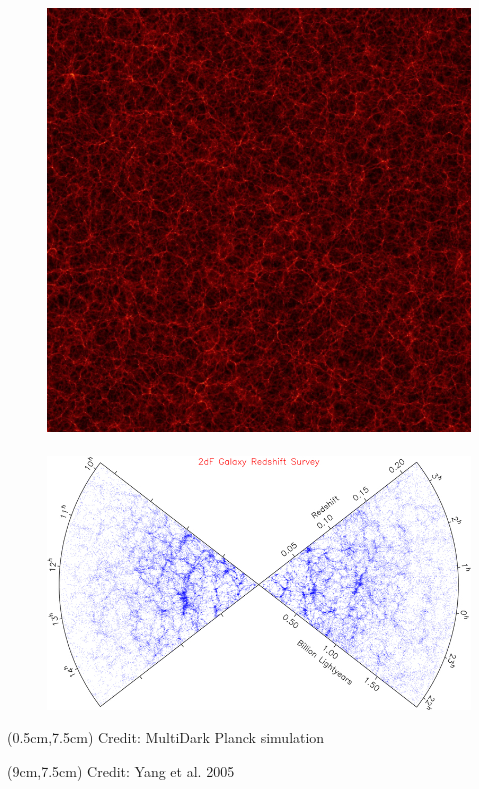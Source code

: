 \documentclass[aspectratio=169]{beamer}
\begin{document}
\begin{frame}[plain,t]
  \begin{figure}
    \includegraphics[height=0.65\textheight]{mdpl.jpg} ~ 
    \includegraphics[height=0.65\textheight]{2dFzcone.jpg}
  \end{figure}
  \begin{textblock*}{6cm}(0.5cm,7.5cm)
    {Credit: MultiDark Planck simulation}
  \end{textblock*}
    \begin{textblock*}{4cm}(9cm,7.5cm)
    {Credit: Yang et al. 2005}
  \end{textblock*}
\end{frame}
\end{document}
